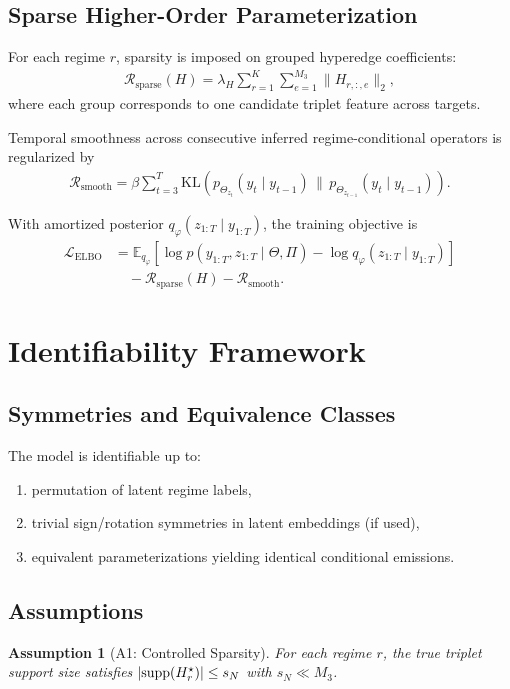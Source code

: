 \documentclass[11pt]{article}
\newtheorem{assumption}{Assumption}
\begin{document}
\subsection{Sparse Higher-Order Parameterization}
For each regime $r$, sparsity is imposed on grouped hyperedge coefficients:
\begin{align}
    \mathcal{R}_{\text{sparse}}(H)
    = \lambda_H \sum_{r=1}^K \sum_{e=1}^{M_3} \|H_{r,:,e}\|_2,
\end{align}
where each group corresponds to one candidate triplet feature across targets.

Temporal smoothness across consecutive inferred regime-conditional operators is
regularized by
\begin{align}
    \mathcal{R}_{\text{smooth}}
    = \beta \sum_{t=3}^{T}
    \mathrm{KL}\!\left(
        p_{\Theta_{z_t}}(y_t\mid y_{t-1})
        \,\|\, p_{\Theta_{z_{t-1}}}(y_t\mid y_{t-1})
    \right).
\end{align}

With amortized posterior $q_\varphi(z_{1:T}\mid y_{1:T})$, the training objective is
\begin{align}
    \mathcal{L}_{\text{ELBO}}
    &= \mathbb{E}_{q_\varphi}\!\left[
        \log p(y_{1:T},z_{1:T}\mid \Theta,\Pi)
        - \log q_\varphi(z_{1:T}\mid y_{1:T})
    \right] \\
    &\quad - \mathcal{R}_{\text{sparse}}(H) - \mathcal{R}_{\text{smooth}}.
\end{align}

\section{Identifiability Framework}
\subsection{Symmetries and Equivalence Classes}
The model is identifiable up to:
\begin{enumerate}
    \item permutation of latent regime labels,
    \item trivial sign/rotation symmetries in latent embeddings (if used),
    \item equivalent parameterizations yielding identical conditional emissions.
\end{enumerate}

\subsection{Assumptions}
\begin{assumption}[A1: Controlled Sparsity]
For each regime $r$, the true triplet support size satisfies
$|{\rm supp}(H_r^\star)| \le s_{N}$ with $s_N \ll M_3$.
\end{assumption}
\end{document}
